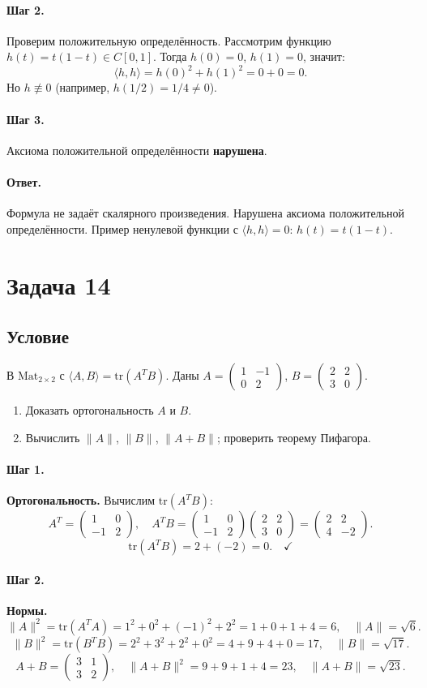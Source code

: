 \documentclass[12pt,a4paper]{article}
\theoremstyle{solution}
\newcommand{\task}[1]{\newpage\section*{Задача #1}}
\newcommand{\answer}{\paragraph{Ответ.}}
\newcommand{\step}[1]{\paragraph{Шаг #1.}}
\newcommand{\tr}{\mathrm{tr}}
\begin{document}
\step{2} Проверим положительную определённость. Рассмотрим функцию $h(t)=t(1-t)\in C[0,1]$. Тогда $h(0)=0$, $h(1)=0$, значит:
\[
\langle h,h\rangle=h(0)^2+h(1)^2=0+0=0.
\]
Но $h\not\equiv0$ (например, $h(1/2)=1/4\neq0$).

\step{3} Аксиома положительной определённости \textbf{нарушена}.

\answer Формула не задаёт скалярного произведения. Нарушена аксиома положительной определённости. Пример ненулевой функции с $\langle h,h\rangle=0$: $h(t)=t(1-t)$.

\task{14}
\subsection*{Условие}
В $\mathrm{Mat}_{2\times2}$ с $\langle A,B\rangle=\tr(A^TB)$.
Даны $A=\begin{pmatrix}1&-1\\0&2\end{pmatrix}$, $B=\begin{pmatrix}2&2\\3&0\end{pmatrix}$.
\begin{enumerate}
\item Доказать ортогональность $A$ и $B$.
\item Вычислить $\|A\|$, $\|B\|$, $\|A+B\|$; проверить теорему Пифагора.
\end{enumerate}

\step{1} \textbf{Ортогональность.} Вычислим $\tr(A^TB)$:
\[
A^T=\begin{pmatrix}1&0\\-1&2\end{pmatrix},\quad
A^TB=\begin{pmatrix}1&0\\-1&2\end{pmatrix}\begin{pmatrix}2&2\\3&0\end{pmatrix}
=\begin{pmatrix}2&2\\4&-2\end{pmatrix}.
\]
\[
\tr(A^TB)=2+(-2)=0.\quad\checkmark
\]

\step{2} \textbf{Нормы.}
\[
\|A\|^2=\tr(A^TA)=1^2+0^2+(-1)^2+2^2=1+0+1+4=6,\quad\|A\|=\sqrt{6}.
\]
\[
\|B\|^2=\tr(B^TB)=2^2+3^2+2^2+0^2=4+9+4+0=17,\quad\|B\|=\sqrt{17}.
\]
\[
A+B=\begin{pmatrix}3&1\\3&2\end{pmatrix},\quad
\|A+B\|^2=9+9+1+4=23,\quad\|A+B\|=\sqrt{23}.
\]
\end{document}
